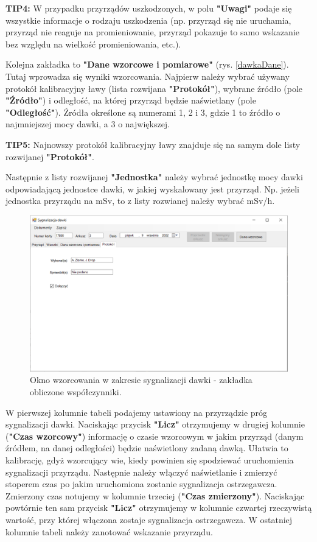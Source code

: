 	\textbf{TIP4:} W przypadku przyrządów uszkodzonych, w polu \textbf{"Uwagi"} podaje się wszystkie informacje o rodzaju uszkodzenia (np. przyrząd się nie uruchamia, przyrząd nie reaguje na promieniowanie, przyrząd pokazuje to samo wskazanie bez względu na wielkość promieniowania, etc.).
	
	Kolejna zakładka to \textbf{"Dane wzorcowe i pomiarowe"} (rys. \ref{dawkaDane}). Tutaj wprowadza się wyniki wzorcowania. Najpierw należy wybrać używany protokół kalibracyjny ławy (lista rozwijana \textbf{"Protokół"}), wybrane źródło (pole \textbf{"Źródło"}) i odległość, na której przyrząd będzie naświetlany (pole \textbf{"Odległość"}). Źródła określone są numerami 1, 2 i 3, gdzie 1 to źródło o najmniejszej mocy dawki, a 3 o największej.
	
	\textbf{TIP5:} Najnowszy protokół kalibracyjny ławy znajduje się na samym dole listy rozwijanej \textbf{"Protokół"}.
	
	Następnie z listy rozwijanej \textbf{"Jednostka"} należy wybrać jednostkę mocy dawki odpowiadającą jednostce dawki, w jakiej wyskalowany jest przyrząd. Np. jeżeli jednostka przyrządu na mSv, to z listy rozwianej należy wybrać mSv/h.
	
	\begin{figure}[htb]
		\centering
		\includegraphics[width=\columnwidth]{obrazki/Wzorcowanie/syg_dawki/wspolczynniki.png}
		\caption{Okno wzorcowania w zakresie sygnalizacji dawki - zakładka obliczone współczynniki.}
		\label{sygDawkiWspolczynniki}
	\end{figure}
	
	W pierwszej kolumnie tabeli podajemy ustawiony na przyrządzie próg sygnalizacji dawki. Naciskając przycisk \textbf{"Licz"} otrzymujemy w drugiej kolumnie (\textbf{"Czas wzorcowy"}) informację o czasie wzorcowym w jakim przyrząd (danym źródłem, na danej odległości) będzie naświetlony zadaną dawką. Ułatwia to kalibrację, gdyż wzorcujący wie, kiedy powinien się spodziewać uruchomienia sygnalizacji przyrządu. Następnie należy włączyć naświetlanie i zmierzyć stoperem czas po jakim uruchomiona zostanie sygnalizacja ostrzegawcza. Zmierzony czas notujemy w kolumnie trzeciej (\textbf{"Czas zmierzony"}). Naciskając powtórnie ten sam przycisk \textbf{"Licz"} otrzymujemy w kolumnie czwartej rzeczywistą wartość, przy której włączona zostaje sygnalizacja ostrzegawcza. W ostatniej kolumnie tabeli należy zanotować wskazanie przyrządu.
	
